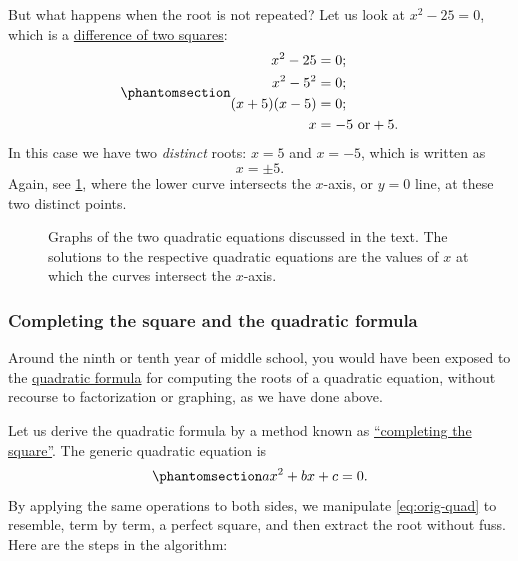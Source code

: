 \documentclass[
  a4paper,
]{article}
\begin{document}
But what happens when the root is not repeated? Let us look at
\(x^2 - 25 = 0\), which is a
\href{https://en.wikipedia.org/wiki/Difference_of_two_squares}{difference
of two squares}:
\begin{equation}\phantomsection\label{eq:plus-minus-five}{
\begin{aligned}
x^2 - 25 &= 0;\\
x^2 -5^2 &= 0;\\
(x + 5)(x - 5) &= 0;\\
x &= -5 \text{ or} +5.\\ 
\end{aligned}
}\end{equation} In this case we have two \emph{distinct} roots:
\(x = 5\) and \(x = -5\), which is written as \[
x = \pm5.
\] Again, see \cref{fig:quadratic-graphs}, where the lower curve
intersects the \(x\)-axis, or \(y=0\) line, at these two distinct
points.

\begin{figure}
\centering

\caption{Graphs of the two quadratic equations discussed in the text.
The solutions to the respective quadratic equations are the values of
\(x\) at which the curves intersect the
\(x\)-axis.}\label{fig:quadratic-graphs}
\end{figure}

\subsubsection{Completing the square and the quadratic
formula}\label{completing-the-square-and-the-quadratic-formula}

Around the ninth or tenth year of middle school, you would have been
exposed to the
\href{https://en.wikipedia.org/wiki/Quadratic_formula}{quadratic
formula} for computing the roots of a quadratic equation, without
recourse to factorization or graphing, as we have done above.

Let us derive the quadratic formula by a method known as
\href{https://en.wikipedia.org/wiki/Completing_the_square}{``completing
the square''}. The generic quadratic equation is
\begin{equation}\phantomsection\label{eq:orig-quad}{
ax^2 + bx + c = 0.
}\end{equation} By applying the same operations to both sides, we
manipulate \cref{eq:orig-quad} to resemble, term by term, a perfect
square, and then extract the root without fuss. Here are the steps in
the algorithm:
\end{document}
